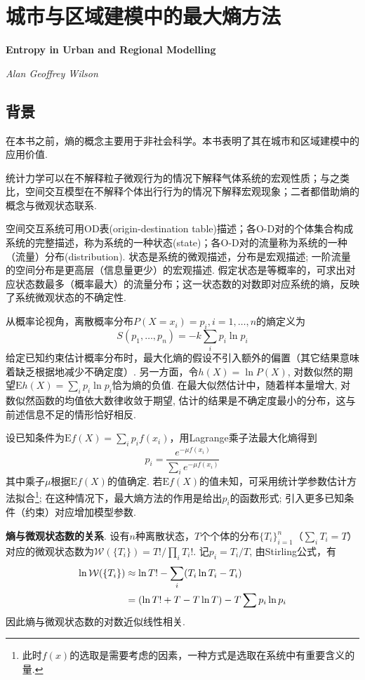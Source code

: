 
\chapter{城市与区域建模中的最大熵方法}
\Large\textbf{Entropy in Urban and Regional Modelling}
\par \emph{Alan Geoffrey Wilson} \normalsize

\section{背景}
\par 在本书之前，熵的概念主要用于非社会科学。本书表明了其在城市和区域建模中的应用价值. 
\par 统计力学可以在不解释粒子微观行为的情况下解释气体系统的宏观性质；与之类比，空间交互模型在不解释个体出行行为的情况下解释宏观现象；二者都借助熵的概念与微观状态联系. 
\par 空间交互系统可用OD表(origin-destination table)描述；各O-D对的个体集合构成系统的完整描述，称为系统的一种状态(state)；各O-D对的流量称为系统的一种（流量）分布(distribution). 状态是系统的微观描述，分布是宏观描述; 一阶流量的空间分布是更高层（信息量更少）的宏观描述. 假定状态是等概率的，可求出对应状态数最多（概率最大）的流量分布；这一状态数的对数即对应系统的熵，反映了系统微观状态的不确定性. 

\par 从概率论视角，离散概率分布$P(X=x_i)=p_i,i=1,\dots, n$的熵定义为
\begin{equation}
    S(p_1,\dots,p_n)=-k\sum_i p_i\ln p_i
\end{equation}
给定已知约束估计概率分布时，最大化熵的假设不引入额外的偏置（其它结果意味着缺乏根据地减少不确定度）. 另一方面，令$h(X)=\ln P(X)$, 对数似然的期望$\mathrm{E}h(X)=\sum_i p_i \ln p_i$恰为熵的负值. 在最大似然估计中，随着样本量增大, 对数似然函数的均值依大数律收敛于期望, 估计的结果是不确定度最小的分布，这与前述信息不足的情形恰好相反. 
\par 设已知条件为$\mathrm{E} f(X)=\sum_i p_if(x_i)$，用Lagrange乘子法最大化熵得到\begin{equation}
    p_i=\frac{e^{-\mu f(x_i)}}{\sum_i e^{-\mu f(x_i)}}
\end{equation}
其中乘子$\mu$根据$\mathrm{E} f(X)$的值确定. 若$\mathrm{E} f(X)$的值未知，可采用统计学参数估计方法拟合\footnote{此时$f(x)$的选取是需要考虑的因素，一种方式是选取在系统中有重要含义的量. }; 在这种情况下，最大熵方法的作用是给出$p_i$的函数形式; 引入更多已知条件（约束）对应增加模型参数. 

\par \textbf{熵与微观状态数的关系}. 设有$n$种离散状态，$T$个个体的分布$\{T_i\}_{i=1}^n$（$\sum_i T_i=T$）对应的微观状态数为$\mathcal{W}(\{T_i\})=T!/\prod_i T_i!$. 记$p_i=T_i/T$, 由Stirling公式，有
\begin{align}
\ln\mathcal{W}(\{T_i\})&\approx \ln T!-\sum_i (T_i\ln T_i-T_i)\notag\\
&= (\ln T!+T-T\ln T) - T\sum p_i\ln p_i
\end{align}
因此熵与微观状态数的对数近似线性相关. 

